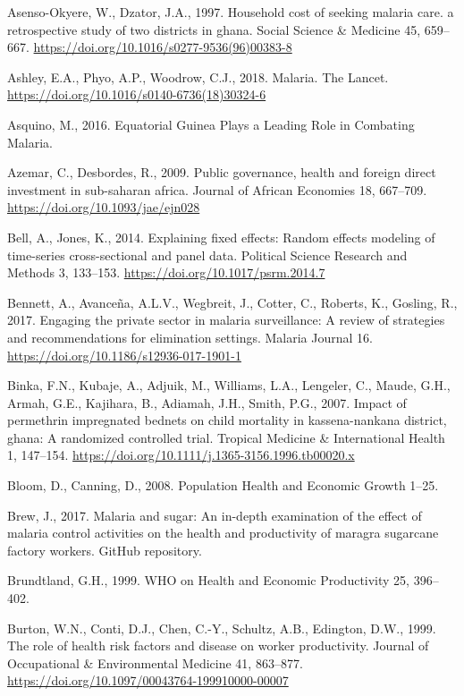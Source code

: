 \documentclass[]{article}
\begin{document}
\hypertarget{ref-AsensoOkyere1997}{}
Asenso-Okyere, W., Dzator, J.A., 1997. Household cost of seeking malaria
care. a retrospective study of two districts in ghana. Social Science \&
Medicine 45, 659--667.
\url{https://doi.org/10.1016/s0277-9536(96)00383-8}

\hypertarget{ref-Ashley2018}{}
Ashley, E.A., Phyo, A.P., Woodrow, C.J., 2018. Malaria. The Lancet.
\url{https://doi.org/10.1016/s0140-6736(18)30324-6}

\hypertarget{ref-asquino2015}{}
Asquino, M., 2016. Equatorial Guinea Plays a Leading Role in Combating
Malaria.

\hypertarget{ref-Azemar2009}{}
Azemar, C., Desbordes, R., 2009. Public governance, health and foreign
direct investment in sub-saharan africa. Journal of African Economies
18, 667--709. \url{https://doi.org/10.1093/jae/ejn028}

\hypertarget{ref-Bell2014}{}
Bell, A., Jones, K., 2014. Explaining fixed effects: Random effects
modeling of time-series cross-sectional and panel data. Political
Science Research and Methods 3, 133--153.
\url{https://doi.org/10.1017/psrm.2014.7}

\hypertarget{ref-Bennett_2017}{}
Bennett, A., Avanceña, A.L.V., Wegbreit, J., Cotter, C., Roberts, K.,
Gosling, R., 2017. Engaging the private sector in malaria surveillance:
A review of strategies and recommendations for elimination settings.
Malaria Journal 16. \url{https://doi.org/10.1186/s12936-017-1901-1}

\hypertarget{ref-Binka2007}{}
Binka, F.N., Kubaje, A., Adjuik, M., Williams, L.A., Lengeler, C.,
Maude, G.H., Armah, G.E., Kajihara, B., Adiamah, J.H., Smith, P.G.,
2007. Impact of permethrin impregnated bednets on child mortality in
kassena-nankana district, ghana: A randomized controlled trial. Tropical
Medicine \& International Health 1, 147--154.
\url{https://doi.org/10.1111/j.1365-3156.1996.tb00020.x}

\hypertarget{ref-Bloom2008}{}
Bloom, D., Canning, D., 2008. Population Health and Economic Growth
1--25.

\hypertarget{ref-brewgit}{}
Brew, J., 2017. Malaria and sugar: An in-depth examination of the effect
of malaria control activities on the health and productivity of maragra
sugarcane factory workers. GitHub repository.

\hypertarget{ref-World1999}{}
Brundtland, G.H., 1999. WHO on Health and Economic Productivity 25,
396--402.

\hypertarget{ref-Burton1999}{}
Burton, W.N., Conti, D.J., Chen, C.-Y., Schultz, A.B., Edington, D.W.,
1999. The role of health risk factors and disease on worker
productivity. Journal of Occupational \& Environmental Medicine 41,
863--877. \url{https://doi.org/10.1097/00043764-199910000-00007}
\end{document}
